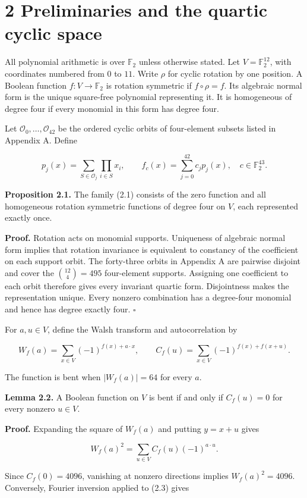 \documentclass[11pt,a4paper]{article}
\begin{document}
\section*{2 Preliminaries and the quartic cyclic space}

All polynomial arithmetic is over $\mathbb F_2$ unless otherwise stated. Let $V=\mathbb F_2^{12}$, with coordinates numbered from $0$ to $11$. Write $\rho$ for cyclic rotation by one position. A Boolean function $f:V\to\mathbb F_2$ is rotation symmetric if $f\circ\rho=f$. Its algebraic normal form is the unique square-free polynomial representing it. It is homogeneous of degree four if every monomial in this form has degree four.

Let $\mathcal O_0,\ldots,\mathcal O_{42}$ be the ordered cyclic orbits of four-element subsets listed in Appendix A. Define

\[
p_j(x)=\sum_{S\in\mathcal O_j}\prod_{i\in S}x_i,
\qquad f_c(x)=\sum_{j=0}^{42}c_jp_j(x),\quad c\in\mathbb F_2^{43}. \tag{2.1}
\]

\textbf{Proposition 2.1.} The family (2.1) consists of the zero function and all homogeneous rotation symmetric functions of degree four on $V$, each represented exactly once.

\textbf{Proof.} Rotation acts on monomial supports. Uniqueness of algebraic normal form implies that rotation invariance is equivalent to constancy of the coefficient on each support orbit. The forty-three orbits in Appendix A are pairwise disjoint and cover the $\binom{12}{4}=495$ four-element supports. Assigning one coefficient to each orbit therefore gives every invariant quartic form. Disjointness makes the representation unique. Every nonzero combination has a degree-four monomial and hence has degree exactly four. \hfill$\square$

For $a,u\in V$, define the Walsh transform and autocorrelation by

\[
W_f(a)=\sum_{x\in V}(-1)^{f(x)+a\cdot x},\qquad
C_f(u)=\sum_{x\in V}(-1)^{f(x)+f(x+u)}. \tag{2.2}
\]

The function is bent when $|W_f(a)|=64$ for every $a$.

\textbf{Lemma 2.2.} A Boolean function on $V$ is bent if and only if $C_f(u)=0$ for every nonzero $u\in V$.

\textbf{Proof.} Expanding the square of $W_f(a)$ and putting $y=x+u$ gives

\[
W_f(a)^2=\sum_{u\in V}C_f(u)(-1)^{a\cdot u}. \tag{2.3}
\]

Since $C_f(0)=4096$, vanishing at nonzero directions implies $W_f(a)^2=4096$. Conversely, Fourier inversion applied to (2.3) gives
\end{document}
